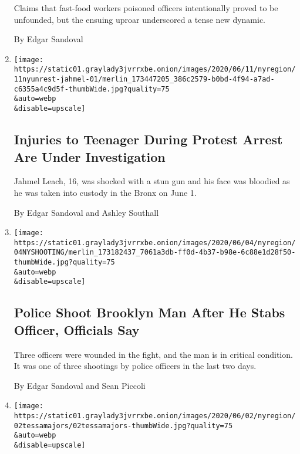 \begin{enumerate}
  Claims that fast-food workers poisoned officers intentionally proved
  to be unfounded, but the ensuing uproar underscored a tense new
  dynamic.

  By Edgar Sandoval
\item
  \href{/2020/06/11/nyregion/jahmel-leach-arrest.html}{}

  \texttt{[image: https://static01.graylady3jvrrxbe.onion/images/2020/06/11/nyregion/11nyunrest-jahmel-01/merlin\_173447205\_386c2579-b0bd-4f94-a7ad-c6355a4c9d5f-thumbWide.jpg?quality=75\\\&auto=webp\\\&disable=upscale]}

  \hypertarget{injuries-to-teenager-during-protest-arrest-are-under-investigation}{%
  \subsection{Injuries to Teenager During Protest Arrest Are Under
  Investigation}\label{injuries-to-teenager-during-protest-arrest-are-under-investigation}}

  Jahmel Leach, 16, was shocked with a stun gun and his face was
  bloodied as he was taken into custody in the Bronx on June 1.

  By Edgar Sandoval and Ashley Southall
\item
  \href{/2020/06/04/nyregion/nypd-officers-shot-brooklyn.html}{}

  \texttt{[image: https://static01.graylady3jvrrxbe.onion/images/2020/06/04/nyregion/04NYSHOOTING/merlin\_173182437\_7061a3db-ff0d-4b37-b98e-6c88e1d28f50-thumbWide.jpg?quality=75\\\&auto=webp\\\&disable=upscale]}

  \hypertarget{police-shoot-brooklyn-man-after-he-stabs-officer-officials-say}{%
  \subsection{Police Shoot Brooklyn Man After He Stabs Officer,
  Officials
  Say}\label{police-shoot-brooklyn-man-after-he-stabs-officer-officials-say}}

  Three officers were wounded in the fight, and the man is in critical
  condition. It was one of three shootings by police officers in the
  last two days.

  By Edgar Sandoval and Sean Piccoli
\item
  \href{/2020/06/03/nyregion/tessa-majors-barnard-plea.html}{}

  \texttt{[image: https://static01.graylady3jvrrxbe.onion/images/2020/06/02/nyregion/02tessamajors/02tessamajors-thumbWide.jpg?quality=75\\\&auto=webp\\\&disable=upscale]}


\end{enumerate}
